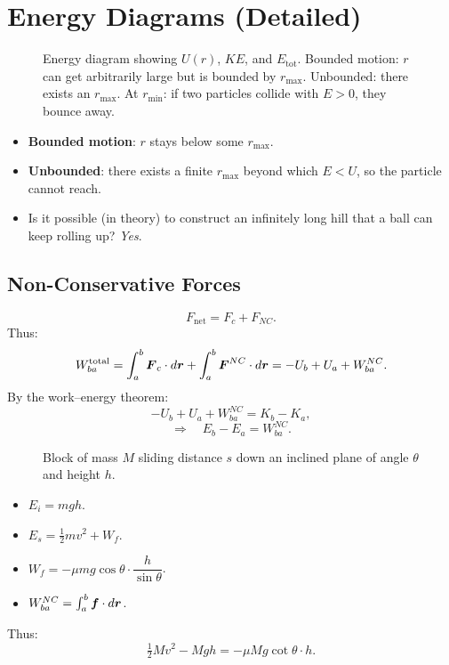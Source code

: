 \section{Energy Diagrams (Detailed)}

\begin{figure}[H]
    \centering
    \caption{Energy diagram showing $U(r)$, $KE$, and $E_{\text{tot}}$. Bounded motion: $r$ can get arbitrarily large but is bounded by $r_{\max}$. Unbounded: there exists an $r_{\max}$. At $r_{\min}$: if two particles collide with $E > 0$, they bounce away.}
\end{figure}

\begin{itemize}
    \item \textbf{Bounded motion}: $r$ stays below some $r_{\max}$.
    \item \textbf{Unbounded}: there exists a finite $r_{\max}$ beyond which $E < U$, so the particle cannot reach.
    \item Is it possible (in theory) to construct an infinitely long hill that a ball can keep rolling up? \emph{Yes}.
\end{itemize}

\subsection{Non-Conservative Forces}

\[
    F_{\text{net}} = F_c + F_{NC}.
\]
Thus:
\[
    W_{ba}^{\text{total}} = \int_a^b \vect{F}_c\cdot d\lvect{r} + \int_a^b \vect{F}^{NC}\cdot d\lvect{r} = -U_b + U_a + W_{ba}^{NC}.
\]
By the work–energy theorem:
\[
    -U_b + U_a + W_{ba}^{NC} = K_b - K_a,
\]
\[
    \Rightarrow \quad \boxed{E_b - E_a = W_{ba}^{NC}.}
\]

\begin{example}
\begin{figure}[H]
    \centering
    \caption{Block of mass $M$ sliding distance $s$ down an inclined plane of angle $\theta$ and height $h$.}
\end{figure}

\begin{itemize}
    \item $E_i = mgh$.
    \item $E_s = \tfrac{1}{2}mv^2 + W_f$.
    \item $W_f = -\mu mg\cos\theta \cdot \dfrac{h}{\sin\theta}$.
    \item $W_{ba}^{NC} = \int_a^b \bm{f}\cdot d\bm{r}$.
\end{itemize}

Thus:
\[
    \tfrac{1}{2}Mv^2 - Mgh = -\mu Mg\cot\theta \cdot h.
\]
\end{example}

